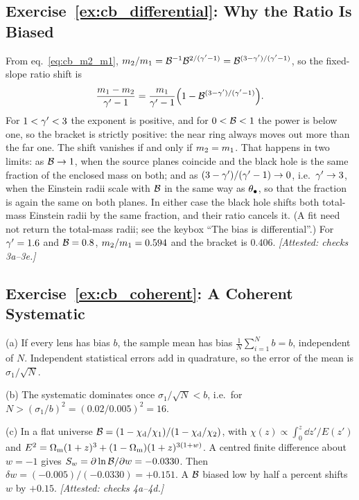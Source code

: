 \subsection*{Exercise~\ref{ex:cb_differential}: Why the Ratio Is Biased}

From eq.~\eqref{eq:cb_m2_m1},
$m_2/m_1=\mathcal{B}^{-1}\mathcal{B}^{2/(\gamma'-1)}=\mathcal{B}^{(3-\gamma')/(\gamma'-1)}$, so
the fixed-slope ratio shift is
\begin{equation*}
  \frac{m_1-m_2}{\gamma'-1}=\frac{m_1}{\gamma'-1}\Big(1-\mathcal{B}^{(3-\gamma')/(\gamma'-1)}\Big).
\end{equation*}
For $1<\gamma'<3$ the exponent is positive, and for $0<\mathcal{B}<1$ the power is
below one, so the bracket is strictly positive: the near ring always
moves out more than the far one. The shift vanishes if and only if
$m_2=m_1$. That happens in two limits: as $\mathcal{B}\to1$, when the
source planes coincide and the black hole is the same fraction of the
enclosed mass on both; and as $(3-\gamma')/(\gamma'-1)\to0$, i.e.\ $\gamma'\to3$,
when the Einstein radii scale with $\mathcal{B}$ in the same way as
$\theta_{\bullet}$, so that the fraction is again the same on both planes.
In either case the black hole shifts both total-mass Einstein radii by
the same fraction, and their ratio cancels it. (A fit need not return
the total-mass radii; see the keybox ``The bias is differential''.) For $\gamma'=1.6$ and
$\mathcal{B}=0.8$, $m_2/m_1=0.594$ and the bracket is $0.406$.
\emph{[Attested: checks 3a--3e.]}

\subsection*{Exercise~\ref{ex:cb_coherent}: A Coherent Systematic}

(a) If every lens has bias $b$, the sample mean has bias
$\tfrac1N\sum_{i=1}^N b=b$, independent of $N$. Independent statistical
errors add in quadrature, so the error of the mean is
$\sigma_1/\sqrt{N}$.

(b) The systematic dominates once $\sigma_1/\sqrt{N}<b$, i.e.\
for $N>(\sigma_1/b)^2=(0.02/0.005)^2=16$.

(c) In a flat universe
$\mathcal{B}=(1-\chi_{\rm d}/\chi_1)/(1-\chi_{\rm d}/\chi_2)$, with
$\chi(z)\propto\int_0^z\dd z'/E(z')$ and
$E^2=\Omega_{\mathrm{m}}(1+z)^3+(1-\Omega_{\mathrm{m}})(1+z)^{3(1+w)}$. A centred finite
difference about $w=-1$ gives $S_w=\partial\ln\mathcal{B}/\partial w=-0.0330$.
Then $\delta w=(-0.005)/(-0.0330)=+0.151$. A $\mathcal{B}$ biased low by half a
percent shifts $w$ by $+0.15$.
\emph{[Attested: checks 4a--4d.]}

